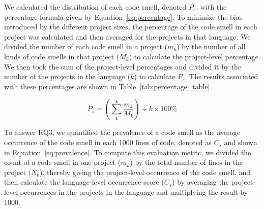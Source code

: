 


We calculated the distribution of each code smell, denoted $P_{s}$, with the
percentage formula given by Equation~\ref{eq:percentage}. To minimize the bias
introduced by the different project sizes, the percentage of the code smell in
each project was calculated and then averaged for the projects in that language.
%
We divided the number of each code smell in a project ($m_{k}$) by the number of
all kinds of code smells in that project ({$M_{k}$}) to calculate the
project-level percentage. We then took the sum of the project-level percentages
and divided it by the number of the projects in the language ($k$) to calculate
$P_{s}$. The results associated with these percentages are shown in
Table~\ref{tab:percentage_table}.


\begin{equation}
P_{s} = \left( \sum_{1}^{k}\frac{{m_{k}}}{M_{k}} \right) \div {k} \times 100\%
\label{eq:percentage}
\end{equation}


To answer RQ3, we quantified the prevalence of a code smell as the average
occurrence of the code smell in each 1000 lines of code, denoted as $C_{s}$ and
shown in Equation~\ref{eq:prevalence}. To compute this evaluation metric, we
divided the count of a code smell in one project ($m_{k}$) by the total number
of lines in the project ($N_{k}$), thereby giving the project-level occurrence
of the code smell, and then calculate the language-level occurrence score
($C_{s}$) by averaging the project-level occurrences in the projects in the
language and multiplying the result by 1000.

